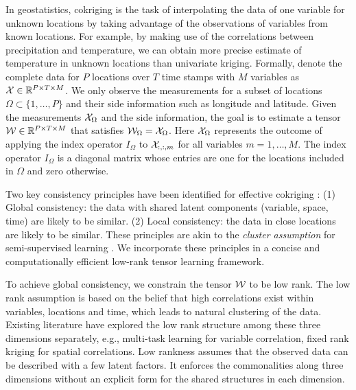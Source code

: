 In geostatistics, cokriging is the task of interpolating the data of one variable for unknown locations by taking advantage of the observations of variables from known locations. For example, by making use of the correlations between precipitation and temperature, we can obtain more precise estimate of temperature in unknown locations than univariate kriging. Formally, denote the complete data for $P$ locations over $T$ time stamps with $M$ variables as ${\mathcal X} \in \mathbb{R}^{P\times T\times M} $. We only observe the measurements for a subset of locations $\Omega \subset \{1, \ldots, P\}$ and their side information such as longitude and latitude. Given the measurements ${\mathcal X}_{\Omega}$ and the side information, the goal is to estimate a tensor ${\mathcal W} \in \mathbb{R}^{P\times T\times M}$ that satisfies ${\mathcal W}_\Omega =  {\mathcal X}_\Omega$. Here ${\mathcal X}_\Omega$ represents the outcome of applying the index operator $I_\Omega$ to ${\mathcal X}_{:, :, m}$ for all variables $ m= 1, \ldots, M$. The index operator $I_\Omega$ is a diagonal matrix whose entries are one for the locations included in $\Omega$ and zero otherwise.



Two key consistency principles have been identified for effective cokriging \cite[Chapter 6.2]{cressie2011statistics}: (1) Global consistency: the data with shared latent components (variable, space, time) are likely to be similar. (2) Local consistency: the data in close locations are likely to be similar. These principles are akin to the \textit{cluster assumption} for semi-supervised learning \cite{zhou2003learning}. We incorporate these principles in a concise and computationally efficient low-rank tensor learning framework.

To achieve global consistency, we constrain the tensor ${\mathcal W}$ to be low rank. The low rank assumption is based on the belief that high correlations exist within variables, locations and time, which leads to natural clustering of the data. Existing literature have explored the low rank structure among these three dimensions separately, e.g., multi-task learning \cite{nie2010efficient} for variable correlation, fixed rank kriging \cite{cressie2008fixed} for spatial correlations. Low rankness assumes that the observed data can be described with a few latent factors. It enforces the commonalities along three dimensions without an explicit form for the shared structures in each dimension.

